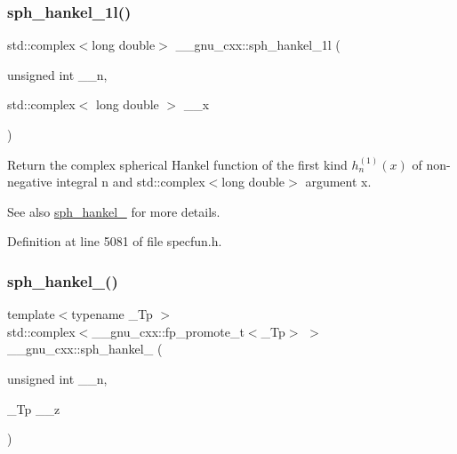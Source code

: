 \subsubsection{\texorpdfstring{sph\+\_\+hankel\+\_\+1l()}{sph\_hankel\_1l()}\hspace{0.1cm}{\footnotesize\ttfamily [2/2]}}
{\footnotesize\ttfamily std\+::complex$<$long double$>$ \+\_\+\+\_\+gnu\+\_\+cxx\+::sph\+\_\+hankel\+\_\+1l (\begin{DoxyParamCaption}\item[{unsigned int}]{\+\_\+\+\_\+n,  }\item[{std\+::complex$<$ long double $>$}]{\+\_\+\+\_\+x }\end{DoxyParamCaption})\hspace{0.3cm}{\ttfamily [inline]}}

Return the complex spherical Hankel function of the first kind $ h^{(1)}_n(x) $ of non-\/negative integral {\ttfamily n} and {\ttfamily std\+::complex$<$long double$>$} argument {\ttfamily x}.

\begin{DoxySeeAlso}{See also}
\hyperlink{group__mathsf__gnu_ga4424f565fb224ab88b177beb65d08305}{sph\+\_\+hankel\+\_} for more details. 
\end{DoxySeeAlso}


Definition at line 5081 of file specfun.\+h.

\mbox{\label{group__mathsf__gnu_ga1ca08866a25e3637b04c57ff5a0c36a5}} 
\subsubsection{\texorpdfstring{sph\+\_\+hankel\+\_()}{sph\_hankel\_2()}\hspace{0.1cm}{\footnotesize\ttfamily [1/2]}}
{\footnotesize\ttfamily template$<$typename \+\_\+\+Tp $>$ \\
std\+::complex$<$\+\_\+\+\_\+gnu\+\_\+cxx\+::fp\+\_\+promote\+\_\+t$<$\+\_\+\+Tp$>$ $>$ \+\_\+\+\_\+gnu\+\_\+cxx\+::sph\+\_\+hankel\+\_ (\begin{DoxyParamCaption}\item[{unsigned int}]{\+\_\+\+\_\+n,  }\item[{\+\_\+\+Tp}]{\+\_\+\+\_\+z }\end{DoxyParamCaption})\hspace{0.3cm}{\ttfamily [inline]}}

